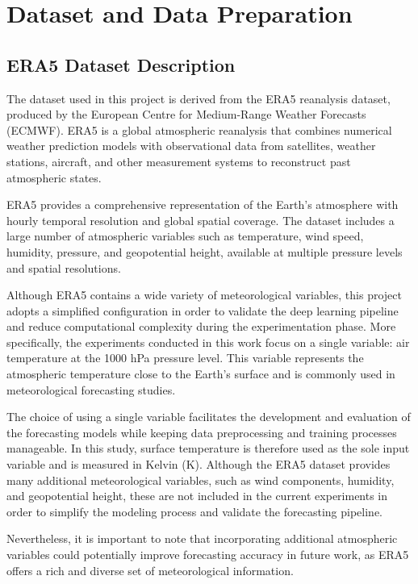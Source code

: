 \chapter{Dataset and Data Preparation}
\label{chap:Dataset and Data Preparation}

\section{ERA5 Dataset Description}
The dataset used in this project is derived from the ERA5 reanalysis dataset, produced by the European Centre for Medium-Range Weather Forecasts (ECMWF). ERA5 is a global atmospheric reanalysis that combines numerical weather prediction models with observational data from satellites, weather stations, aircraft, and other measurement systems to reconstruct past atmospheric states.

ERA5 provides a comprehensive representation of the Earth's atmosphere with hourly temporal resolution and global spatial coverage. The dataset includes a large number of atmospheric variables such as temperature, wind speed, humidity, pressure, and geopotential height, available at multiple pressure levels and spatial resolutions.

Although ERA5 contains a wide variety of meteorological variables, this project adopts a simplified configuration in order to validate the deep learning pipeline and reduce computational complexity during the experimentation phase. More specifically, the experiments conducted in this work focus on a single variable: air temperature at the 1000 hPa pressure level. This variable represents the atmospheric temperature close to the Earth's surface and is commonly used in meteorological forecasting studies.

The choice of using a single variable facilitates the development and evaluation of the forecasting models while keeping data preprocessing and training processes manageable. In this study, surface temperature is therefore used as the sole input variable and is measured in Kelvin (K). Although the ERA5 dataset provides many additional meteorological variables, such as wind components, humidity, and geopotential height, these are not included in the current experiments in order to simplify the modeling process and validate the forecasting pipeline.

Nevertheless, it is important to note that incorporating additional atmospheric variables could potentially improve forecasting accuracy in future work, as ERA5 offers a rich and diverse set of meteorological information.
